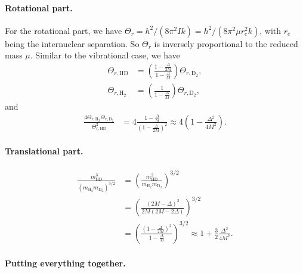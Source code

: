 \documentclass[twocolumn, 10pt]{article}
\numberwithin{equation}{section}
\newenvironment{solution}[1][\empty]
{\par\medskip\sffamily
  \textbf{\ifx\empty#1{Solution.}\relax\else{#1}\fi} \ignorespaces}
{\medskip}
\begin{document}
\begin{solution}
  \paragraph*{Rotational part.}
  For the rotational part,
  we have
  $\Theta_r = h^2/(8\pi^2Ik) = h^2/(8\pi^2\mu r_e^2 k)$,
  with $r_e$
  being the internuclear separation.
  So $\Theta_r$ is inversely proportional to
  the reduced mass $\mu$.
  Similar to the vibrational case, we have
  \begin{align*}
    \Theta_{r, \mathrm{HD}}
    &=
    \left(
    \frac{ 1 - \frac{\Delta}{2M} }
         { 1 - \frac{\Delta}{M} }
    \right)
    \Theta_{r, \mathrm{D}_2}
    ,
    \\
    \Theta_{r, \mathrm{H}_2}
    &=
    \left(
    \frac{ 1 }
         { 1-\frac{\Delta}{M} }
    \right)
    \Theta_{r, \mathrm{D}_2}
    ,
  \end{align*}
  and
  \begin{align}
    \frac{
      4 \Theta_{r, \mathrm{H}_2}
      \Theta_{r, \mathrm{D}_2}
    } {
      \Theta_{r, \mathrm{HD}}^2
    }
    &=
    4\frac{ 1 - \frac{\Delta}{M} }
         { (1 - \frac{\Delta}{2M})^2 }
    \approx
    4\left(1 - \frac{ \Delta^2 } { 4 M^2 } \right)
    .
    \label{eq:ratio_rot}
  \end{align}

  \paragraph*{Translational part.}

  \begin{align*}
    \frac{
      m_{\mathrm{HD}}^3
    } {
      \left(
      m_{\mathrm{H}_2}
      m_{\mathrm{D}_2}
      \right)^{3/2}
    }
    &=
    \left(
    \frac{
      m_{\mathrm{HD}}^2
    } {
      m_{\mathrm{H}_2}
      m_{\mathrm{D}_2}
    }
    \right)^{3/2}
    \\
    &=
    \left(
    \frac{ (2M-\Delta)^2 }
     { 2M(2M-2\Delta) }
    \right)^{3/2}
    \\
    &=
    \left(
    \frac{ (1-\frac{\Delta}{2M})^2 }
     { 1-\frac{\Delta}{M} }
    \right)^{3/2}
    \approx
    1 + \frac{3}{2} \frac{\Delta^2}{4M^2}
    .
  \end{align*}

  \paragraph*{Putting everything together.}


\end{solution}
\end{document}
